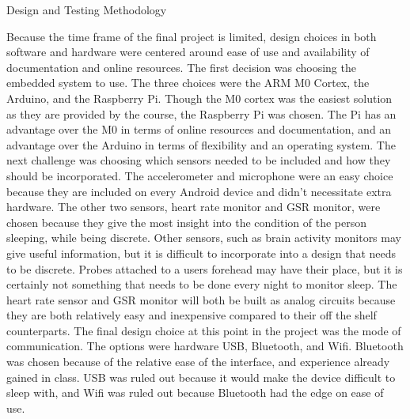 \documentclass[finalProposal.tex]{subfiles}
\begin{document}
\onehalfspacing

{\Large Design and Testing Methodology}

\bigskip

Because the time frame of the final project is limited, design choices in both software and hardware were centered around ease of use and availability of documentation and online resources. 
The first decision was choosing the embedded system to use. The three choices were the ARM M0 Cortex, the Arduino, and the Raspberry Pi. Though the M0 cortex was the easiest solution as they are provided by the course, the Raspberry Pi was chosen. The Pi has an advantage over the M0 in terms of online resources and documentation, and an advantage over the Arduino in terms of flexibility and an operating system. The next challenge was choosing which sensors needed to be included and how they should be incorporated. The accelerometer and microphone were an easy choice because they are included on every Android device and didn't necessitate extra hardware. The other two sensors, heart rate monitor and GSR monitor, were chosen because they give the most insight into the condition of the person sleeping, while being discrete. Other sensors, such as brain activity monitors may give useful information, but it is difficult to incorporate into a design that needs to be discrete. Probes attached to a users forehead may have their place, but it is certainly not something that needs to be done every night to monitor sleep. The heart rate sensor and GSR monitor will both be built as analog circuits because they are both relatively easy and inexpensive compared to their off the shelf counterparts. The final design choice at this point in the project was the mode of communication. The options were hardware USB, Bluetooth, and Wifi. Bluetooth was chosen because of the relative ease of the interface, and experience already gained in class. USB was ruled out because it would make the device difficult to sleep with, and Wifi was ruled out because Bluetooth had the edge on ease of use.
\end{document}
